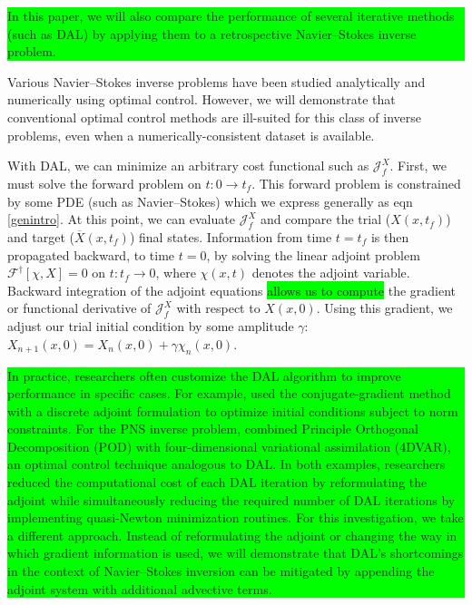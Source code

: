 \documentclass[%
 reprint,
 amsmath,amssymb,
 aps,
 pre,
]{revtex4-2}
\newcommand{\hly}[1]{\colorbox{lime}{\parbox{\columnwidth}{#1}}}
\newcommand{\J}{\mathcal{J}}
\begin{document}
\hspace{-0.38cm}\hly{In this paper, we will also compare the performance of several iterative methods (such as DAL) by applying them to a retrospective Navier--Stokes inverse problem.}
Various Navier--Stokes inverse problems have been studied analytically and numerically using optimal control.
However, we will demonstrate that conventional optimal control methods are ill-suited for this class of inverse problems, even when a numerically-consistent dataset is available.

With DAL, we can minimize an arbitrary cost functional such as $\J_f^X$.
First, we must solve the forward problem on $t:0\to t_f$.
This forward problem is constrained by some PDE (such as Navier--Stokes) which we express generally as eqn \ref{genintro}.
At this point, we can evaluate $\J_f^X$ and compare the trial ($X(x, t_f)$) and target ($\overline{X}(x, t_f)$) final states.
Information from time $t=t_f$ is then propagated backward, to time $t=0$, by solving the linear adjoint problem $\mathcal{F}^{\dagger}[\chi, X]=0$ on $t:t_f\to 0$, where $\chi(x,t)$ denotes the adjoint variable.
Backward integration of the adjoint equations \colorbox{lime}{allows us to compute} the gradient or functional derivative of $\J_f^X$ with respect to $X(x, 0)$. 
Using this gradient, we adjust our trial initial condition by some amplitude $\gamma$: $X_{n+1}(x, 0) = X_n(x, 0) + \gamma\chi_n(x, 0)$.


\hspace{-0.45cm}\hly{\hspace{0.5cm} In practice, researchers often customize the DAL algorithm to improve performance in specific cases.
For example, \cite{Mannix2022discrete} used the conjugate-gradient method with a discrete adjoint formulation to optimize initial conditions subject to norm constraints.
For the PNS inverse problem, \cite{Du2013} combined Principle Orthogonal Decomposition (POD) with four-dimensional variational assimilation (4DVAR), an optimal control technique analogous to DAL.
In both examples, researchers reduced the computational cost of each DAL iteration by reformulating the adjoint while simultaneously reducing the required number of DAL iterations by implementing quasi-Newton minimization routines.
For this investigation, we take a different approach.
Instead of reformulating the adjoint or changing the way in which gradient information is used, we will demonstrate that DAL's shortcomings in the context of Navier--Stokes inversion can be mitigated by appending the adjoint system with additional advective terms.}
\end{document}
